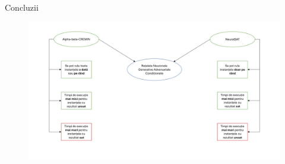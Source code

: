 \begin{frame}{Concluzii}
    \begin{figure}[ht]
    \centering
    {\includegraphics[width=12cm]{images/concluzii.jpeg}}
    \label{rezultateNeuralSat}
    \end{figure}
\end{frame}